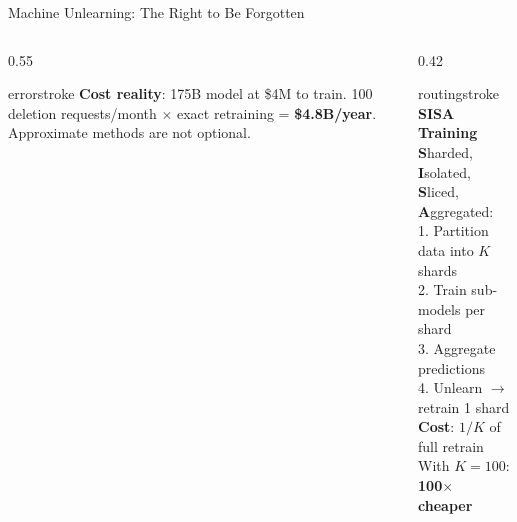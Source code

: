 \documentclass[aspectratio=169, 12pt]{beamer}
\begin{document}
\begin{frame}{Machine Unlearning: The Right to Be Forgotten}
\begin{columns}[T]
\begin{column}{0.55\textwidth}
    \vspace{0.1cm}
    \begin{mlsyscard}{errorstroke}
    {\scriptsize \textbf{Cost reality}: 175B model at \$4M to train. 100 deletion requests/month $\times$ exact retraining = \textbf{\$4.8B/year}. Approximate methods are not optional.}
    \end{mlsyscard}
  \end{column}
  \begin{column}{0.42\textwidth}
    \begin{mlsyscard}{routingstroke}
    \textbf{SISA Training}\\[0.05cm]
    {\scriptsize
    \textbf{S}harded, \textbf{I}solated, \textbf{S}liced, \textbf{A}ggregated:\\[0.05cm]
    1. Partition data into $K$ shards\\
    2. Train sub-models per shard\\
    3. Aggregate predictions\\
    4. Unlearn $\to$ retrain 1 shard\\[0.1cm]
    \textbf{Cost}: $1/K$ of full retrain\\
    With $K=100$: \textbf{100$\times$ cheaper}}
    \end{mlsyscard}
  \end{column}
\end{columns}

\end{frame}
\end{document}
